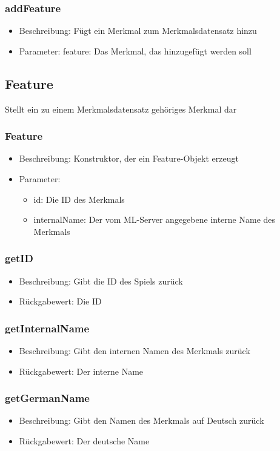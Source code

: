 \documentclass[a4paper]{scrreprt}
\begin{document}
	\subsubsection{addFeature}
	\begin{itemize}
		\item Beschreibung: Fügt ein Merkmal zum Merkmalsdatensatz hinzu
		\item Parameter: feature: Das Merkmal, das hinzugefügt werden soll
	\end{itemize}

	\subsection{Feature}
	Stellt ein zu einem Merkmalsdatensatz gehöriges Merkmal dar
	\subsubsection{Feature}
	\begin{itemize}
		\item Beschreibung: Konstruktor, der ein Feature-Objekt erzeugt
		\item Parameter:
		\begin{itemize}
			\item id: Die ID des Merkmals
			\item internalName: Der vom ML-Server angegebene interne Name des Merkmals
		\end{itemize}
	\end{itemize}
	\subsubsection{getID}
	\begin{itemize}
		\item Beschreibung: Gibt die ID des Spiels zurück
		\item Rückgabewert: Die ID
	\end{itemize}
	\subsubsection{getInternalName}
	\begin{itemize}
		\item Beschreibung: Gibt den internen Namen des Merkmals zurück
		\item Rückgabewert: Der interne Name
	\end{itemize}
	\subsubsection{getGermanName}
	\begin{itemize}
		\item Beschreibung: Gibt den Namen des Merkmals auf Deutsch zurück
		\item Rückgabewert: Der deutsche Name
	\end{itemize}
\end{document}
